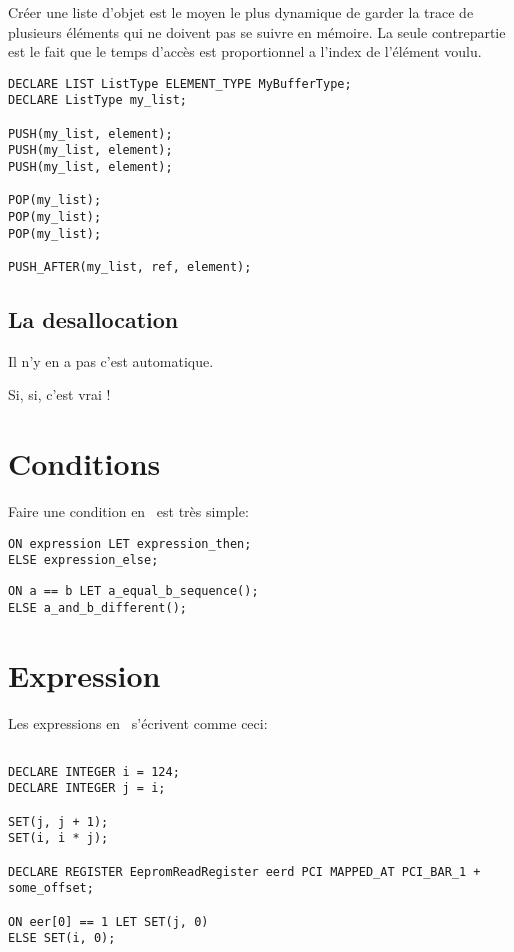 \documentclass{rtxreport}
\begin{document}
Créer une liste d'objet est le moyen le plus dynamique de garder la trace de
plusieurs éléments qui ne doivent pas se suivre en mémoire.  La seule
contrepartie est le fait que le temps d'accès est proportionnel a l'index de
l'élément voulu.

\begin{lstlisting}
DECLARE LIST ListType ELEMENT_TYPE MyBufferType;
DECLARE ListType my_list;

PUSH(my_list, element);
PUSH(my_list, element);
PUSH(my_list, element);

POP(my_list);
POP(my_list);
POP(my_list);

PUSH_AFTER(my_list, ref, element);
\end{lstlisting}



\subsection{La desallocation}
Il n'y en a pas c'est automatique.

Si, si, c'est vrai !

\section{Conditions}

Faire une condition en \rtx\  est très simple:
\begin{lstlisting}[caption=Syntaxe des conditions]
ON expression LET expression_then;
ELSE expression_else;
\end{lstlisting}

\begin{lstlisting}[caption=Exemple de condition]
ON a == b LET a_equal_b_sequence();
ELSE a_and_b_different();
\end{lstlisting}


\section{Expression}
Les expressions en \rtx\  s'écrivent comme ceci:
\begin{lstlisting}[caption=Ecriture des expressions]

DECLARE INTEGER i = 124;
DECLARE INTEGER j = i;

SET(j, j + 1);
SET(i, i * j);

DECLARE REGISTER EepromReadRegister eerd PCI MAPPED_AT PCI_BAR_1 + some_offset;

ON eer[0] == 1 LET SET(j, 0)
ELSE SET(i, 0);

\end{lstlisting}
\end{document}
